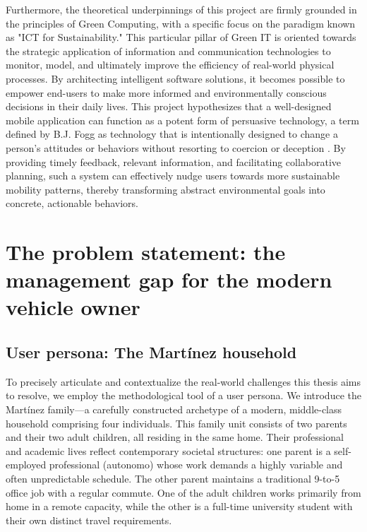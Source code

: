 Furthermore, the theoretical underpinnings of this project are firmly grounded in the principles of Green Computing, with a specific focus on the paradigm known as "ICT for Sustainability." This particular pillar of Green IT is oriented towards the strategic application of information and communication technologies to monitor, model, and ultimately improve the efficiency of real-world physical processes. By architecting intelligent software solutions, it becomes possible to empower end-users to make more informed and environmentally conscious decisions in their daily lives. This project hypothesizes that a well-designed mobile application can function as a potent form of persuasive technology, a term defined by B.J. Fogg as technology that is intentionally designed to change a person's attitudes or behaviors without resorting to coercion or deception \cite{fogg2002persuasive}. By providing timely feedback, relevant information, and facilitating collaborative planning, such a system can effectively nudge users towards more sustainable mobility patterns, thereby transforming abstract environmental goals into concrete, actionable behaviors.

\section{The problem statement: the management gap for the modern vehicle owner}

\subsection{User persona: The Martínez household}

To precisely articulate and contextualize the real-world challenges this thesis aims to resolve, we employ the methodological tool of a user persona. We introduce the Martínez family—a carefully constructed archetype of a modern, middle-class household comprising four individuals. This family unit consists of two parents and their two adult children, all residing in the same home. Their professional and academic lives reflect contemporary societal structures: one parent is a self-employed professional (\gls{autonomo}) whose work demands a highly variable and often unpredictable schedule. The other parent maintains a traditional 9-to-5 office job with a regular commute. One of the adult children works primarily from home in a remote capacity, while the other is a full-time university student with their own distinct travel requirements.

